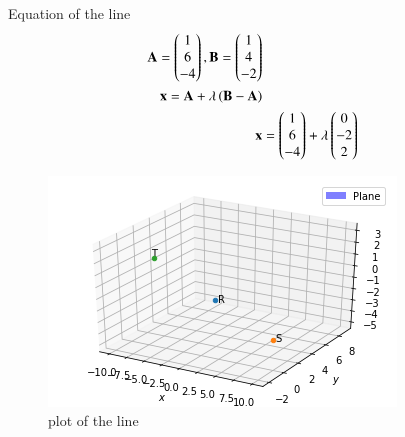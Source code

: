 \documentclass[journal,12pt,twocolumn]{IEEEtran}
\begin{document}
 Equation of the line
\begin{align}
\mathbf{A} = \begin{pmatrix}1 \\ 6 \\ -4\end{pmatrix} , \mathbf{B} = \begin{pmatrix}1 \\ 4 \\ -2\end{pmatrix}
\\
\mathbf{x} = \mathbf{A}+\lambda\left({\mathbf{B}-\mathbf{A}}\right)
\\
\mathbf{x} &= \begin{pmatrix}1 \\ 6 \\ -4\end{pmatrix}+\lambda\begin{pmatrix}0 \\ -2 \\2\end{pmatrix}
\end{align}
\begin{figure}[ht]
\centering
\includegraphics[width=\columnwidth]{figure.png}
\caption{plot of the line}
\label{Plot of the line}
\end{figure}
\end{document}
